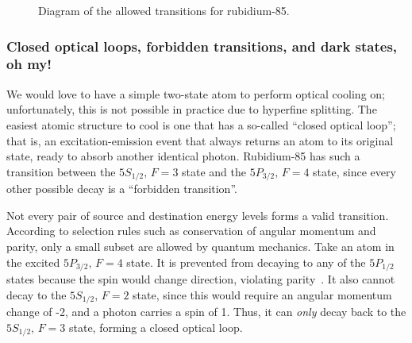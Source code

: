 \documentclass[11pt,twoside,a4paper]{article}
\begin{document}
\begin{figure}[h]
    \caption{Diagram of the allowed transitions for rubidium-85.~\cite{ust}}
\end{figure}
\subsubsection{Closed optical loops, forbidden transitions, and dark states, oh my!}
We would love to have a simple two-state atom to perform optical cooling on; unfortunately, this is not possible in practice due to hyperfine splitting. The easiest atomic structure to cool is one that has a so-called ``closed optical loop''; that is,
an excitation-emission event that always returns an atom to its original state, ready to absorb another identical photon. Rubidium-85 has such a transition between the \(5S_{1/2},\,F=3\) state and the \(5P_{3/2},\,F=4\) state, since every other possible decay is a ``forbidden transition''.

Not every pair of source and destination energy levels forms a valid transition. According to selection rules such as conservation of angular momentum and parity, only a small subset are allowed by quantum mechanics. Take an atom in the excited \(5P_{3/2},\,F=4\) state.
It is prevented from decaying to any of the \(5P_{1/2}\) states because the spin would change direction, violating parity~\cite{harandbert}. It also cannot decay to the \(5S_{1/2},\,F=2\) state, since this would require an angular momentum change of -2, and a photon carries
a spin of 1. Thus, it can \textit{only} decay back to the \(5S_{1/2},\,F=3\) state, forming a closed optical loop.
\end{document}
